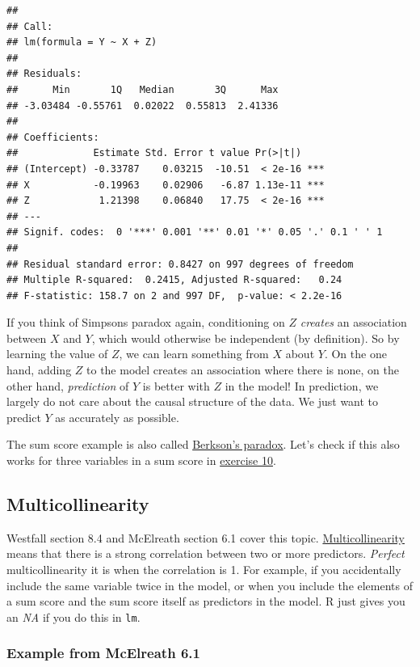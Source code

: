 \documentclass[
]{book}
\begin{document}
\begin{verbatim}
## 
## Call:
## lm(formula = Y ~ X + Z)
## 
## Residuals:
##      Min       1Q   Median       3Q      Max 
## -3.03484 -0.55761  0.02022  0.55813  2.41336 
## 
## Coefficients:
##             Estimate Std. Error t value Pr(>|t|)    
## (Intercept) -0.33787    0.03215  -10.51  < 2e-16 ***
## X           -0.19963    0.02906   -6.87 1.13e-11 ***
## Z            1.21398    0.06840   17.75  < 2e-16 ***
## ---
## Signif. codes:  0 '***' 0.001 '**' 0.01 '*' 0.05 '.' 0.1 ' ' 1
## 
## Residual standard error: 0.8427 on 997 degrees of freedom
## Multiple R-squared:  0.2415, Adjusted R-squared:   0.24 
## F-statistic: 158.7 on 2 and 997 DF,  p-value: < 2.2e-16
\end{verbatim}

If you think of Simpsons paradox again, conditioning on \(Z\) \emph{creates} an association between \(X\) and \(Y\),
which would otherwise be independent (by definition). So by learning the value of \(Z\), we can learn something
from \(X\) about \(Y\). On the one hand, adding \(Z\) to the model creates an association where there is none,
on the other hand, \emph{prediction} of \(Y\) is better with \(Z\) in the model! In prediction, we largely
do not care about the causal structure of the data. We just want to predict \(Y\) as accurately as possible.

The sum score example is also called \href{https://en.wikipedia.org/wiki/Berkson\%27s_paradox}{Berkson's paradox}.
Let's check if this also works for three variables in a sum score
in \hyperref[exercise10_multiple_regression]{exercise 10}.

\subsection{Multicollinearity}\label{multicollinearity}

Westfall section 8.4 and McElreath section 6.1 cover this topic.
\href{https://en.wikipedia.org/wiki/Multicollinearity}{Multicollinearity} means that there is a strong
correlation between two or more predictors. \emph{Perfect} multicollinearity it is when the correlation is 1.
For example, if you accidentally include the same variable twice in the model, or when you include
the elements of a sum score and the sum score itself as predictors in the model. R just gives you
an \emph{NA} if you do this in \texttt{lm}.

\subsubsection{Example from McElreath 6.1}\label{mcElreath_6.1}
\end{document}
